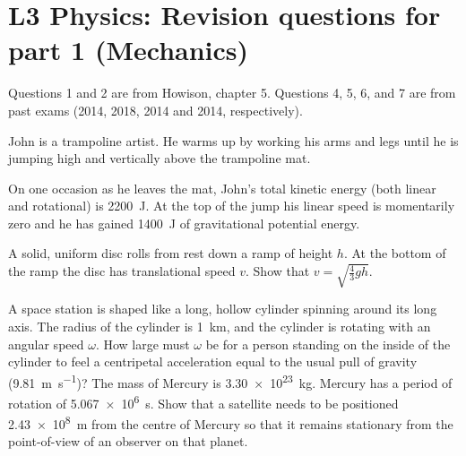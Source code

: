 \documentclass[a4paper]{exam}
\begin{document}
  \section*{L3 Physics: Revision questions for part 1 (Mechanics)}
  Questions 1 and 2 are from Howison, chapter 5. Questions 4, 5, 6, and 7 are from past exams (2014, 2018, 2014 and 2014, respectively).
  \begin{questions}
    \question John is a trampoline artist. He warms up by working his arms and legs until he is jumping high and vertically above
              the trampoline mat.

              On one occasion as he leaves the mat, John's total kinetic energy (both linear and rotational) is \SI{2200}{\joule}.
              At the top of the jump his linear speed is momentarily zero and he has gained \SI{1400}{\joule} of gravitational potential energy.
    \question A solid, uniform disc rolls from rest down a ramp of height $ h $. At the bottom of
              the ramp the disc has translational speed $ v $. Show that $ v = \sqrt{\frac{4}{3}gh} $.

    \question A space station is shaped like a long, hollow cylinder spinning around its long axis. The radius
              of the cylinder is \SI{1}{\kilo\metre}, and the cylinder is rotating with an angular speed $ \omega $.
              How large must $ \omega $ be for a person standing on the inside of the cylinder to feel a centripetal
              acceleration equal to the usual pull of gravity (\SI{9.81}{\metre\per\second})?
    \question The mass of Mercury is \SI{3.30e23}{\kilo\gram}. Mercury has a period of rotation of \SI{5.067e6}{\second}.
              Show that a satellite needs to be positioned \SI{2.43e8}{\metre} from the centre of Mercury so that it
              remains stationary from the point-of-view of an observer on that planet.
    \question
      \begin{parts}

\end{parts}
\end{questions}
\end{document}
